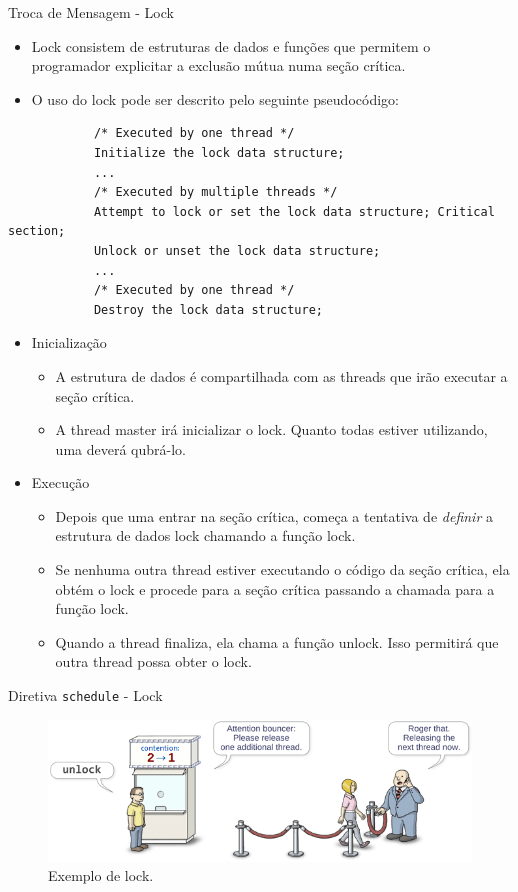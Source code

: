 	\begin{frame}[fragile]{Troca de Mensagem -  Lock}
		\begin{itemize}
			\item Lock consistem de estruturas de dados e funções que permitem o programador explicitar a exclusão mútua numa seção crítica.
			\item O uso do lock pode ser descrito pelo seguinte pseudocódigo:
		\end{itemize}
		\begin{verbatim}
			/* Executed by one thread */
			Initialize the lock data structure;
			...
			/* Executed by multiple threads */
			Attempt to lock or set the lock data structure; Critical section;
			Unlock or unset the lock data structure;
			...
			/* Executed by one thread */
			Destroy the lock data structure;
		\end{verbatim}
		\begin{itemize}
			\item Inicialização
			\begin{itemize}
				\item A estrutura de dados é compartilhada com as threads que irão executar a seção crítica.
				\item A thread master irá inicializar o lock. Quanto todas estiver utilizando, uma deverá qubrá-lo.
			\end{itemize}
			\item Execução
			\begin{itemize}
				\item Depois que uma entrar na seção crítica, começa a tentativa de \textit{definir} a estrutura de dados lock chamando a função lock.
				\item Se nenhuma outra thread estiver executando o código da seção crítica, ela obtém o lock e procede para a seção crítica passando a chamada para a função lock.
				\item Quando a thread finaliza, ela chama a função unlock. Isso permitirá que outra thread possa obter o lock.
			\end{itemize}
		\end{itemize}
\end{frame}

	\begin{frame}{Diretiva {\tt schedule} - Lock}
		\begin{figure}[p]
			\centering
			\includegraphics[width=1\textwidth]{img/pacheco/mutex.png}
			\caption{Exemplo de lock.}
		\end{figure}
	\end{frame}

